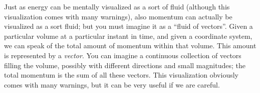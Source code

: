 \documentclass[a4paper,12pt,%
onecolumn,oneside,titlepage,%
british%
]{memoir}
\renewcommand*{\|}[1][]{\nonscript\:#1\vert\nonscript\:\mathopen{}}
\begin{document}
%
%
Just as energy can be mentally visualized as a sort of fluid (although this visualization comes with many warnings), also momentum can actually be visualized as a sort fluid; but you must imagine it as a \enquote{fluid of vectors}.
Given a particular volume at a particular instant in time, and given a coordinate system, we can speak of the total amount of momentum within that volume. This amount is represented by a \emph{vector}. You can imagine a continuous collection of vectors filling the volume, possibly with different directions and small magnitudes; the total momentum is the sum of all these vectors. This visualization obviously comes with many warnings, but it can be very useful if we are careful.
\end{document}
